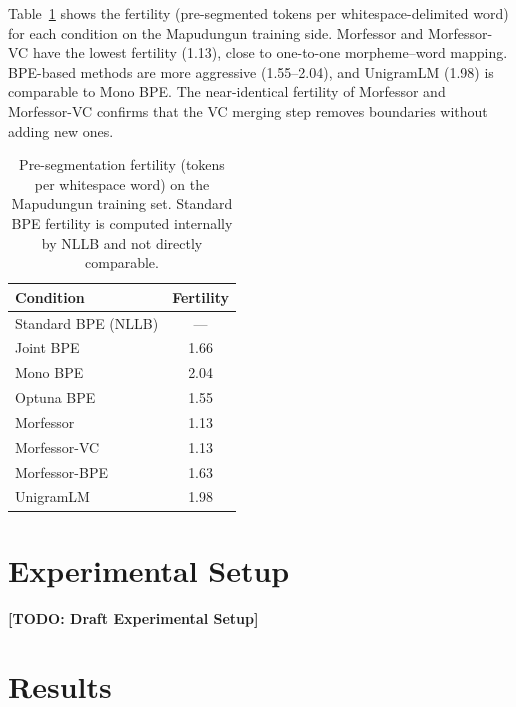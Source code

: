 \documentclass[11pt]{article}
\newcommand{\todo}[1]{\textbf{[TODO: #1]}}
\begin{document}
Table~\ref{tab:fertility} shows the fertility (pre-segmented tokens per whitespace-delimited word) for each condition on the Mapudungun training side. Morfessor and Morfessor-VC have the lowest fertility (1.13), close to one-to-one morpheme--word mapping. BPE-based methods are more aggressive (1.55--2.04), and UnigramLM (1.98) is comparable to Mono BPE. The near-identical fertility of Morfessor and Morfessor-VC confirms that the VC merging step removes boundaries without adding new ones.

\begin{table}[h]
\centering
\begin{tabular}{lc}
\hline
\textbf{Condition} & \textbf{Fertility} \\
\hline
Standard BPE (NLLB) & --- \\
Joint BPE           & 1.66 \\
Mono BPE            & 2.04 \\
Optuna BPE          & 1.55 \\
Morfessor           & 1.13 \\
Morfessor-VC        & 1.13 \\
Morfessor-BPE       & 1.63 \\
UnigramLM           & 1.98 \\
\hline
\end{tabular}
\caption{Pre-segmentation fertility (tokens per whitespace word) on the Mapudungun training set. Standard BPE fertility is computed internally by NLLB and not directly comparable.}
\label{tab:fertility}
\end{table}

\section{Experimental Setup}

\todo{Draft Experimental Setup}

\section{Results}
\end{document}
